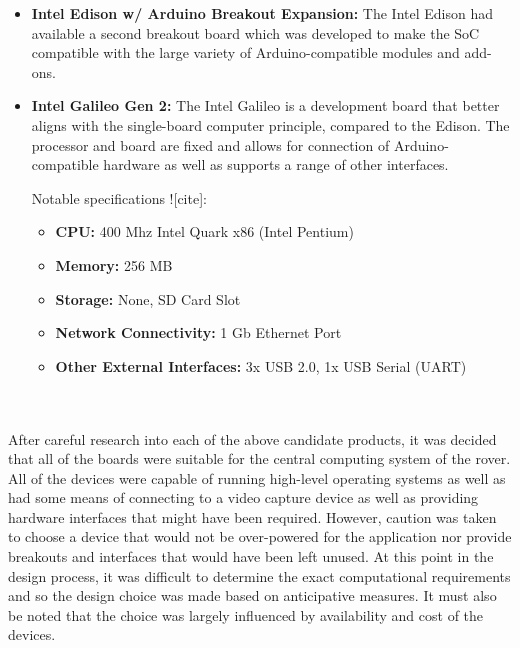 \begin{itemize}
        \item \textbf{Intel Edison w/ Arduino Breakout Expansion:}
          The Intel Edison had available a second breakout board which was developed to make the SoC compatible with the large variety of Arduino-compatible modules and add-ons.

        \item \textbf{Intel Galileo Gen 2:}
          The Intel Galileo is a development board that better aligns with the single-board computer principle, compared to the Edison. The processor and board are fixed and allows for connection of Arduino-compatible hardware as well as supports a range of other interfaces.
          
          Notable specifications ![cite]:
          \begin{itemize}
            \item \textbf{CPU:} 400 Mhz Intel Quark x86 (Intel Pentium)
            \item \textbf{Memory:} 256 MB
            \item \textbf{Storage:} None, SD Card Slot
            \item \textbf{Network Connectivity:} 1 Gb Ethernet Port
            \item \textbf{Other External Interfaces:} 3x USB 2.0, 1x USB Serial (UART)
          \end{itemize}
      \end{itemize}
      
      \\\\
        After careful research into each of the above candidate products, it was decided that all of the boards were suitable for the central computing system of the rover. All of the devices were capable of running high-level operating systems as well as had some means of connecting to a video capture device as well as providing hardware interfaces that might have been required. However, caution was taken to choose a device that would not be over-powered for the application nor provide breakouts and interfaces that would have been left unused. At this point in the design process, it was difficult to determine the exact computational requirements and so the design choice was made based on anticipative measures. It must also be noted that the choice was largely influenced by availability and cost of the devices.
        
